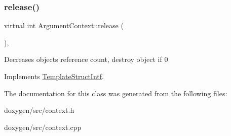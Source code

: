 \mbox{\label{class_argument_context_a4233e98a25aa25c9356b5584f2e338d6}} 
\subsubsection{\texorpdfstring{release()}{release()}}
{\footnotesize\ttfamily virtual int Argument\+Context\+::release (\begin{DoxyParamCaption}{ }\end{DoxyParamCaption})\hspace{0.3cm}{\ttfamily [inline]}, {\ttfamily [virtual]}}

Decreases object\textquotesingle{}s reference count, destroy object if 0 

Implements \mbox{\hyperlink{class_template_struct_intf_a3dce7dd29d3f66a8080b40578e8a5045}{Template\+Struct\+Intf}}.



The documentation for this class was generated from the following files\+:\begin{DoxyCompactItemize}
\item 
doxygen/src/context.\+h\item 
doxygen/src/context.\+cpp\end{DoxyCompactItemize}

